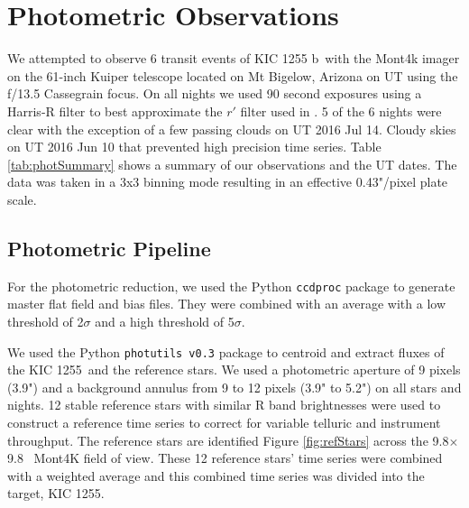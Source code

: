 \documentclass[preprint]{aastex61}
\newcommand{\sha}{KIC 1255 b}
\newcommand{\shStar}{KIC 1255}
\begin{document}
\section{Photometric Observations}\label{sec:photObs}
We attempted to observe 6 transit events of \sha\ with the Mont4k imager on the 61-inch Kuiper telescope located on Mt Bigelow, Arizona on UT using the f/13.5 Cassegrain focus.
On all nights we used 90 second exposures using a Harris-R filter to best approximate the $r'$ filter used in \citet{schlawin2016kic1255}.
5 of the 6 nights were clear with the exception of a few passing clouds on UT 2016 Jul 14.
Cloudy skies on UT 2016 Jun 10 that prevented high precision time series.
Table \ref{tab:photSummary} shows a summary of our observations and the UT dates.
The data was taken in a 3x3 binning mode resulting in an effective 0.43"/pixel plate scale.

\subsection{Photometric Pipeline}

For the photometric reduction, we used the Python \texttt{ccdproc} package \citep{craig2015ccdproc} to generate master flat field and bias files.
They were combined with an average with a low threshold of 2$\sigma$ and a high threshold of 5$\sigma$.

We used the Python \texttt{photutils v0.3} \citep{bradley2016photutilsv0p3} package to centroid and extract fluxes of the \shStar\ and the reference stars.
We used a photometric aperture of 9 pixels (3.9") and a background annulus from 9 to 12 pixels (3.9" to 5.2") on all stars and nights.
12 stable reference stars with similar R band brightnesses were used to construct a reference time series to correct for variable telluric and instrument throughput.
The reference stars are identified Figure \ref{fig:refStars} across the 9.8\arcmin $\times$ 9.8 \arcmin\ Mont4K field of view.
These 12 reference stars' time series were combined with a weighted average and this combined time series was divided into the target, \shStar.
\end{document}
